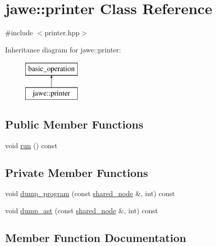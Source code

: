 \hypertarget{classjawe_1_1printer}{}\section{jawe\+:\+:printer Class Reference}
\label{classjawe_1_1printer}


{\ttfamily \#include $<$printer.\+hpp$>$}

Inheritance diagram for jawe\+:\+:printer\+:\begin{figure}[H]
\begin{center}
\leavevmode
\includegraphics[height=2.000000cm]{classjawe_1_1printer}
\end{center}
\end{figure}
\subsection*{Public Member Functions}
\begin{DoxyCompactItemize}
\item 
void \hyperlink{classjawe_1_1printer_a0405800fc94e5dc738a5ba991822a086}{run} () const
\end{DoxyCompactItemize}
\subsection*{Private Member Functions}
\begin{DoxyCompactItemize}
\item 
void \hyperlink{classjawe_1_1printer_ab2889decb6c7f8747dc7889c5ee16e64}{dump\+\_\+program} (const \hyperlink{namespacejawe_a3f307481d921b6cbb50cc8511fc2b544}{shared\+\_\+node} \&, int) const
\item 
void \hyperlink{classjawe_1_1printer_abd79b431ff79970a2bc89186bb1a569d}{dump\+\_\+ast} (const \hyperlink{namespacejawe_a3f307481d921b6cbb50cc8511fc2b544}{shared\+\_\+node} \&, int) const
\end{DoxyCompactItemize}


\subsection{Member Function Documentation}
\mbox{\label{classjawe_1_1printer_abd79b431ff79970a2bc89186bb1a569d}} 
